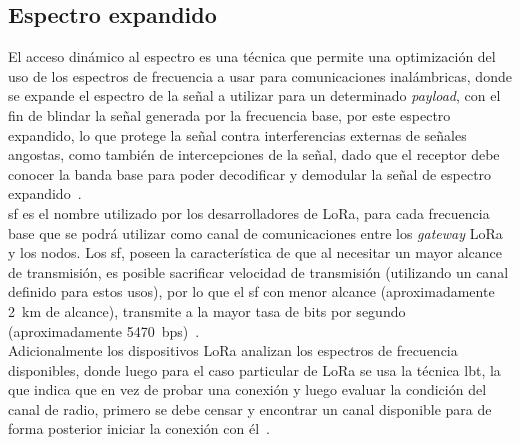 \begin{justify}
\section{Espectro expandido}
El acceso dinámico al espectro es una técnica que permite una optimización del uso de los espectros de frecuencia a usar para comunicaciones inalámbricas, donde se expande el espectro de la señal a utilizar para un determinado \textit{payload}, con el fin de blindar la señal generada por la frecuencia base, por este espectro expandido, lo que protege la señal contra interferencias externas de señales angostas, como también de intercepciones de la señal, dado que el receptor debe conocer la banda base para poder decodificar y demodular la señal de espectro expandido~\cite{modulation}.\\
\gls{sf} es el nombre utilizado por los desarrolladores de LoRa, para cada frecuencia base que se podrá utilizar como canal de comunicaciones entre los \textit{gateway} LoRa y los nodos. Los \gls{sf}, poseen la característica de que al necesitar un mayor alcance de transmisión, es posible sacrificar velocidad de transmisión (utilizando un canal definido para estos usos), por lo que el \gls{sf} con menor alcance (aproximadamente \SI{2}{\kilo\meter} de alcance), transmite a la mayor tasa de bits por segundo (aproximadamente \SI{5470}{bps})~\cite{orange}.\\
Adicionalmente los dispositivos LoRa analizan los espectros de frecuencia disponibles, donde luego para el caso particular de LoRa se usa la técnica \gls{lbt}, la que indica que en vez de probar una conexión y luego evaluar la condición del canal de radio, primero se debe censar y encontrar un canal disponible para de forma posterior iniciar la conexión con él~\cite{modulation}.

\end{justify}
